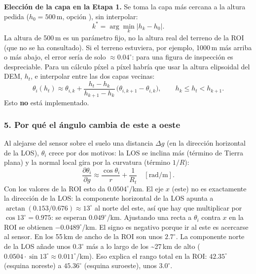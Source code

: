 \documentclass[11pt,a4paper]{article}
\begin{document}
\textbf{Elección de la capa en la Etapa 1.} Se toma la capa más cercana a la altura pedida ($h_0 = 500$\,m, opción
), sin interpolar:
\begin{equation}
  k^\ast = \arg\min_k \lvert h_k - h_0 \rvert .
\end{equation}
La altura de 500\,m es un parámetro fijo, no la altura real del terreno de la ROI (que no se ha consultado). Si el terreno estuviera,
por ejemplo, 1000\,m más arriba o más abajo, el error sería de solo $\approx 0.04^\circ$: para una figura de inspección es despreciable.
Para un cálculo píxel a píxel habría que usar la altura elipsoidal del DEM, $h_t$, e interpolar entre las dos capas vecinas:
\begin{equation}
  \theta_i(h_t) \approx \theta_{i,k} + \frac{h_t - h_k}{h_{k+1} - h_k}\,\bigl(\theta_{i,k+1} - \theta_{i,k}\bigr),
  \qquad h_k \le h_t < h_{k+1}.
\end{equation}
Esto \textbf{no} está implementado.

\subsubsection*{5. Por qué el ángulo cambia de este a oeste}

Al alejarse del sensor sobre el suelo una distancia $\Delta g$ (en la dirección horizontal de la LOS), $\theta_i$ crece por dos
motivos: la LOS se inclina más (término de Tierra plana) y la normal local gira por la curvatura (término $1/R$):
\begin{equation}
  \frac{\partial\theta_i}{\partial g} \approx \frac{\cos\theta_i}{r} + \frac{1}{R_t}\quad[\text{rad/m}].
\end{equation}
Con los valores de la ROI esto da $0.0504^\circ$/km. El eje $x$ (este) no es exactamente la dirección de la LOS: la componente
horizontal de la LOS apunta a $\arctan(0.153/0.676) \approx 13^\circ$ al norte del este, así que hay que multiplicar por
$\cos 13^\circ = 0.975$: se esperan $0.049^\circ$/km. Ajustando una recta a $\theta_i$ contra $x$ en la ROI se obtienen
$-0.0489^\circ$/km. El signo es negativo porque ir al este es acercarse al sensor. En los 55\,km de ancho de la ROI son unos
$2.7^\circ$. La componente norte de la LOS añade unos $0.3^\circ$ más a lo largo de los \textasciitilde 27\,km de alto
($0.0504 \cdot \sin 13^\circ \approx 0.011^\circ$/km). Eso explica el rango total en la ROI: $42.35^\circ$ (esquina noreste) a
$45.36^\circ$ (esquina suroeste), unos $3.0^\circ$.
\end{document}
